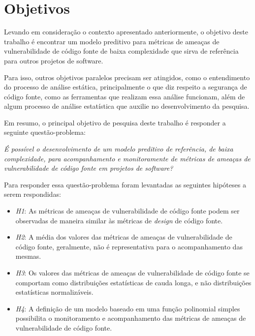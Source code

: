 \section{Objetivos} \label{sec:objetivos}

Levando em consideração o contexto apresentado anteriormente, o objetivo deste
trabalho é encontrar um modelo preditivo para métricas de ameaças de
vulnerabilidade de código fonte de baixa complexidade que sirva de referência
para outros projetos de software.

Para isso, outros objetivos paralelos precisam ser atingidos, como o
entendimento do processo de análise estática, principalmente o que diz respeito
a segurança de código fonte, como as ferramentas que realizam essa análise
funcionam, além de algum processo de análise estatística que auxilie no
desenvolvimento da pesquisa.

Em resumo, o principal objetivo de pesquisa deste trabalho é responder a
seguinte questão-problema:

\begin{center}
  \textit{É possível o desenvolvimento de um modelo preditivo de referência, de
  baixa complexidade, para acompanhamento e monitoramente de métricas de ameaças
de vulnerabilidade de código fonte em projetos de software?}
\end{center}

Para responder essa questão-problema foram levantadas as seguintes hipóteses
a serem respondidas:

\begin{itemize}
  \item \textit{H1}: As métricas de ameaças de vulnerabilidade de código fonte
  podem ser observadas de maneira similar às métricas de \textit{design} de código
  fonte.

  \item \textit{H2}: A média dos valores das métricas de ameaças de vulnerabilidade de
  código fonte, geralmente, não é representativa para o acompanhamento das mesmas.

  \item \textit{H3}: Os valores das métricas de ameaças de vulnerabilidade de
    código fonte se comportam como distribuições estatísticas de cauda longa, e
    não distribuições estatísticas normalizáveis.

  \item \textit{H4}: A definição de um modelo baseado em uma função polinomial
   simples possibilita o monitoramento e acompanhamento das métricas de ameaças
   de vulnerabilidade de código fonte.
\end{itemize}

